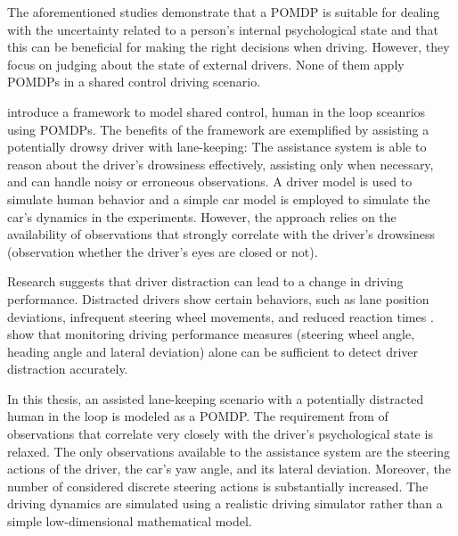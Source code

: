 The aforementioned studies demonstrate that a POMDP is suitable for dealing with the uncertainty related to a person's internal psychological state and that this can be beneficial for making the right decisions when driving. However, they focus on judging about the state of external drivers. None of them apply POMDPs in a shared control driving scenario. 

\cite{hitl_pomdp} introduce a framework to model shared control, human in the loop sceanrios using POMDPs. The benefits of the framework are exemplified by assisting a potentially drowsy driver with lane-keeping: The assistance system is able to reason about the driver's drowsiness effectively, assisting only when necessary, and can handle noisy or erroneous observations. A driver model is used to simulate human behavior and a simple car model is employed to simulate the car's dynamics in the experiments. However, the approach relies on the availability of observations that strongly correlate with the driver's drowsiness (observation whether the driver's eyes are closed or not).


Research suggests that driver distraction can lead to a change in driving performance. Distracted drivers show certain behaviors, such as lane position deviations, infrequent steering wheel movements, and reduced reaction times \parencite{driver-distraction-review}. \cite{dist-det-perf} show that monitoring driving performance measures (steering wheel angle, heading angle and lateral deviation) alone can be sufficient to detect driver distraction accurately.

In this thesis, an assisted lane-keeping scenario with a potentially distracted human in the loop is modeled as a POMDP. The requirement from \cite{hitl_pomdp} of observations that correlate very closely with the driver's psychological state is relaxed. The only observations available to the assistance system are the steering actions of the driver, the car's yaw angle, and its lateral deviation. Moreover, the number of considered discrete steering actions is substantially increased. The driving dynamics are simulated using a realistic driving simulator rather than a simple low-dimensional mathematical model.





